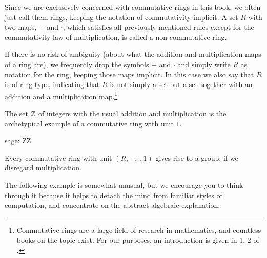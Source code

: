 \begin{notation}Since we are exclusively concerned with commutative rings in this book, we often just call them rings, keeping the notation of commutativity implicit.
A set $R$ with two maps, $+$ and $\cdot$, which satisfies all previously mentioned rules except for the commutativity law of multiplication, is called a non-commutative ring. 

If there is no risk of ambiguity (about what the addition and multiplication maps  of a ring are), we frequently drop the symbols $+$ and $\cdot$ and simply write $R$ as notation for the ring, keeping those maps implicit. In this case we also say that $R$ is of ring type, indicating that $R$ is not simply a set but a set together with an addition and a multiplication map.\footnote{Commutative rings are a large field of research in mathematics, and countless books on the topic exist. For our purposes, an introduction is given in \chaptname{} 1, \secname{} 2 of \cite{nieder-1986}.}
\end{notation}
\begin{example} The set $\mathbb{Z}$ of integers with the usual addition and multiplication is the archetypical example of a commutative ring with unit $1$. 
\begin{sagecommandline}
sage: ZZ
\end{sagecommandline}
\end{example}
\begin{example} Every commutative ring with unit $(R,+,\cdot,1)$ gives rise to a group, if we disregard multiplication.
\end{example}
The following example is somewhat unusual, but we encourage you to think through it because it helps to detach the mind from familiar styles of computation, and concentrate on the abstract algebraic explanation.
